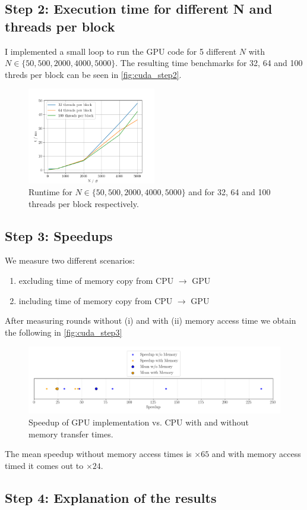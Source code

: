 \subsection{Step 2: Execution time for different N and threads per block}
I implemented a small loop to run the GPU code for 5 different $N$ with $N \in \{50, 500, 2000, 4000, 5000\}$. The resulting time benchmarks for 32, 64 and 100 threds per block can be seen in \autoref{fig:cuda_step2}. 
\begin{figure}[H]
    \centering
    \includegraphics[width=0.5\textwidth]{../fig/lab3/step2.png}
    \caption{Runtime for $N \in \{50, 500, 2000, 4000, 5000\}$ and for 32, 64 and 100 threads per block respectively.}
    \label{fig:cuda_step2}
\end{figure}
\subsection{Step 3: Speedups}
We measure two different scenarios: 
\begin{enumerate}[i]
    \item excluding time of memory copy from CPU $\rightarrow$ GPU
    \item including time of memory copy from CPU $\rightarrow$ GPU
\end{enumerate}
After measuring  rounds without (i) and with (ii) memory access time we obtain the following  in \autoref{fig:cuda_step3}
\begin{figure}[H]
    \centering
    \includegraphics[width=\textwidth]{../fig/lab3/step3.png}
    \caption{Speedup of GPU implementation vs. CPU with and without memory transfer times.}
    \label{fig:cuda_step3}
\end{figure}
The mean speedup without memory access times is $\times 65$ and with memory access timed it comes out to $\times 24$.
\subsection{Step 4: Explanation of the results}
